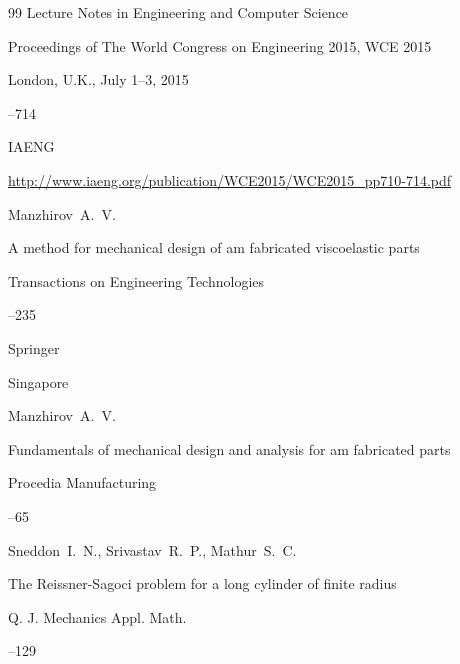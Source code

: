 \begin{thebibliography}{99}
\inbook Lecture Notes in Engineering and Computer Science


\bookinfo Proceedings of The World Congress on Engineering 2015, WCE 2015

\procinfo  London, U.K., July 1--3, 2015


--714

\publaddr IAENG

\elink \url{http://www.iaeng.org/publication/WCE2015/WCE2015_pp710-714.pdf}






\by Manzhirov~A.~V.

\paper A method for mechanical design of am fabricated viscoelastic parts

\inbook Transactions on Engineering Technologies


--235

\publ Springer

\publaddr Singapore







\by Manzhirov~A.~V.

\paper Fundamentals of mechanical design and analysis for am fabricated parts

\jour Procedia Manufacturing



--65





\by Sneddon~I.~N., Srivastav~R.~P., Mathur~S.~C.

\paper The Reissner-Sagoci problem for a long cylinder of finite radius

\jour Q. J. Mechanics Appl. Math.




--129





\end{thebibliography}
